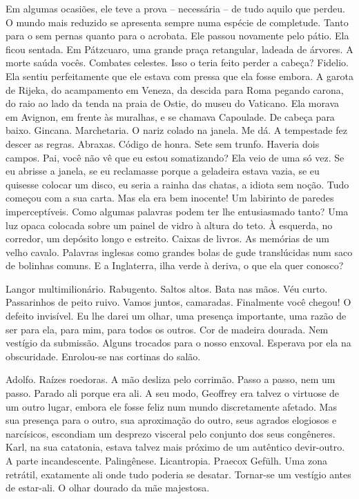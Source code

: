 Em algumas ocasiões, ele teve a prova -- necessária -- de tudo aquilo
que perdeu. O mundo mais reduzido se apresenta sempre numa espécie de
completude. Tanto para o sem pernas quanto para o acrobata. Ele passou
novamente pelo pátio. Ela ficou sentada. Em Pátzcuaro, uma grande praça
retangular, ladeada de árvores. A morte saúda vocês. Combates celestes.
Isso o teria feito perder a cabeça? Fidelio. Ela sentiu perfeitamente
que ele estava com pressa que ela fosse embora. A garota de Rijeka, do
acampamento em Veneza, da descida para Roma pegando carona, do raio ao
lado da tenda na praia de Ostie, do museu do Vaticano. Ela morava em
Avignon, em frente às muralhas, e se chamava Capoulade. De cabeça para
baixo. Gincana. Marchetaria. O nariz colado na janela. Me dá. A
tempestade fez descer as regras. Abraxas. Código de honra. Sete sem
trunfo. Haveria dois campos. Pai, você não vê que eu estou somatizando?
Ela veio de uma só vez. Se eu abrisse a janela, se eu reclamasse porque
a geladeira estava vazia, se eu quisesse colocar um disco, eu seria a
rainha das chatas, a idiota sem noção. Tudo começou com a sua carta. Mas
ela era bem inocente! Um labirinto de paredes imperceptíveis. Como
algumas palavras podem ter lhe entusiasmado tanto? Uma luz opaca
colocada sobre um painel de vidro à altura do teto. À esquerda, no
corredor, um depósito longo e estreito. Caixas de livros. As memórias de
um velho cavalo. Palavras inglesas como grandes bolas de gude
translúcidas num saco de bolinhas comuns. E a Inglaterra, ilha verde à
deriva, o que ela quer conosco?

Langor multimilionário. Rabugento. Saltos altos. Bata nas mãos. Véu
curto. Passarinhos de peito ruivo. Vamos juntos, camaradas. Finalmente
você chegou! O defeito invisível. Eu lhe darei um olhar, uma presença
importante, uma razão de ser para ela, para mim, para todos os outros.
Cor de madeira dourada. Nem vestígio da submissão. Alguns trocados para
o nosso enxoval. Esperava por ela na obscuridade. Enrolou-se nas
cortinas do salão.

Adolfo. Raízes roedoras. A mão desliza pelo corrimão. Passo a passo, nem
um passo. Parado ali porque era ali. A seu modo, Geoffrey era talvez o
virtuose de um outro lugar, embora ele fosse feliz num mundo
discretamente afetado. Mas sua presença para o outro, sua aproximação do
outro, seus agrados elogiosos e narcísicos, escondiam um desprezo
visceral pelo conjunto dos seus congêneres. Karl, na sua catatonia,
estava talvez mais próximo de um autêntico devir-outro. A parte
incandescente. Palingênese. Licantropia. Praecox Gefülh. Uma zona
retrátil, exatamente ali onde tudo poderia se desatar. Tornar-se um
vestígio antes de estar-ali. O olhar dourado da mãe majestosa.

